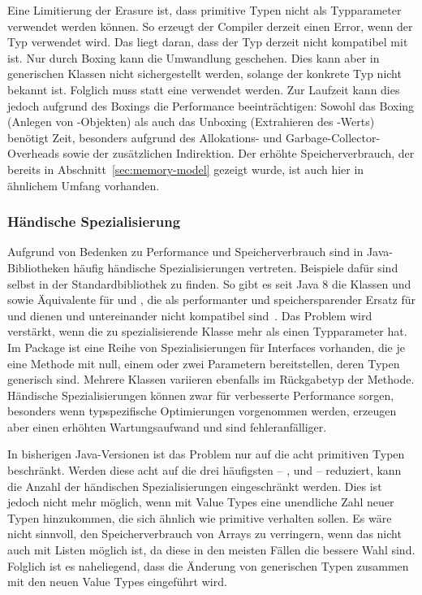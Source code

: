 Eine Limitierung der Erasure ist, dass primitive Typen nicht als Typparameter verwendet werden können.
So erzeugt der Compiler derzeit einen Error, wenn der Typ  verwendet wird.
Das liegt daran, dass der Typ  derzeit nicht kompatibel mit  ist.
Nur durch Boxing kann die Umwandlung  geschehen.
Dies kann aber in generischen Klassen nicht sichergestellt werden, solange der konkrete Typ nicht bekannt ist.
Folglich muss statt  eine  verwendet werden.
Zur Laufzeit kann dies jedoch aufgrund des Boxings die Performance beeinträchtigen:
Sowohl das Boxing (Anlegen von -Objekten) als auch das Unboxing (Extrahieren des -Werts) benötigt Zeit, besonders aufgrund des Allokations- und Garbage-Collector-Overheads sowie der zusätzlichen Indirektion.
Der erhöhte Speicherverbrauch, der bereits in Abschnitt~\ref{sec:memory-model} gezeigt wurde, ist auch hier in ähnlichem Umfang vorhanden.

\subsubsection{Händische Spezialisierung}

Aufgrund von Bedenken zu Performance und Speicherverbrauch sind in Java-Bibliotheken häufig händische Spezialisierungen vertreten.
Beispiele dafür sind selbst in der Standardbibliothek zu finden.
So gibt es seit Java 8 die Klassen  und  sowie Äquivalente für  und , die als performanter und speichersparender Ersatz für  und  dienen und untereinander nicht kompatibel sind~\cite{java-8-docs}.
Das Problem wird verstärkt, wenn die zu spezialisierende Klasse mehr als einen Typparameter hat.
Im Package  ist eine Reihe von Spezialisierungen für Interfaces vorhanden, die je eine Methode mit null, einem oder zwei Parametern bereitstellen, deren Typen generisch sind.
Mehrere Klassen variieren ebenfalls im Rückgabetyp der Methode.
Händische Spezialisierungen können zwar für verbesserte Performance sorgen, besonders wenn typspezifische Optimierungen vorgenommen werden, erzeugen aber einen erhöhten Wartungsaufwand und sind fehleranfälliger.

In bisherigen Java-Versionen ist das Problem nur auf die acht primitiven Typen beschränkt.
Werden diese acht auf die drei häufigsten -- ,  und  -- reduziert, kann die Anzahl der händischen Spezialisierungen eingeschränkt werden.
Dies ist jedoch nicht mehr möglich, wenn mit Value Types eine unendliche Zahl neuer Typen hinzukommen, die sich ähnlich wie primitive verhalten sollen.
Es wäre nicht sinnvoll, den Speicherverbrauch von Arrays zu verringern, wenn das nicht auch mit Listen möglich ist, da diese in den meisten Fällen die bessere Wahl sind.
Folglich ist es naheliegend, dass die Änderung von generischen Typen zusammen mit den neuen Value Types eingeführt wird.

